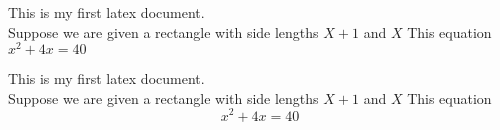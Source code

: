 \documentclass[11pt]{article}
\begin{document}
This is my first latex document. \\
Suppose we are given a rectangle with side lengths $X+1$ and $X$
This equation $x^2+4x = 40$ %

This is my first latex document. \\
Suppose we are given a rectangle with side lengths $X+1$ and $X$
This equation $$x^2+4x = 40$$ %
\end{document}
